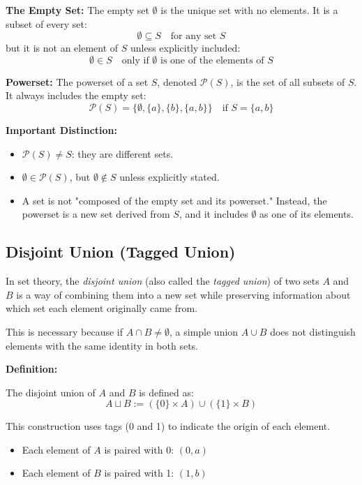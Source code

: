 \documentclass[10pt]{article}
\theoremstyle{plain}
\theoremstyle{definition}
\begin{document}
	\textbf{The Empty Set:} The empty set \( \emptyset \) is the unique set with no elements. It is a subset of every set:
	\[
	\emptyset \subseteq S \quad \text{for any set } S
	\]
	but it is not an element of \( S \) unless explicitly included:
	\[
	\emptyset \in S \quad \text{only if } \emptyset \text{ is one of the elements of } S
	\]
	
	\textbf{Powerset:} The powerset of a set \( S \), denoted \( \mathcal{P}(S) \), is the set of all subsets of \( S \). It always includes the empty set:
	\[
	\mathcal{P}(S) = \{ \emptyset, \{a\}, \{b\}, \{a, b\} \} \quad \text{if } S = \{a, b\}
	\]
	
	\textbf{Important Distinction:}
	\begin{itemize}
		\item \( \mathcal{P}(S) \neq S \): they are different sets.
		\item \( \emptyset \in \mathcal{P}(S) \), but \( \emptyset \notin S \) unless explicitly stated.
		\item A set is not "composed of the empty set and its powerset." Instead, the powerset is a new set derived from \( S \), and it includes \( \emptyset \) as one of its elements.
	\end{itemize}
	
	
	\subsection*{Disjoint Union (Tagged Union)}
	
	In set theory, the \emph{disjoint union} (also called the \emph{tagged union}) of two sets \( A \) and \( B \) is a way of combining them into a new set while preserving information about which set each element originally came from.
	
	This is necessary because if \( A \cap B \neq \emptyset \), a simple union \( A \cup B \) does not distinguish elements with the same identity in both sets.
	
	\textbf{Definition:}
	
	The disjoint union of \( A \) and \( B \) is defined as:
	\[
	A \sqcup B := (\{0\} \times A) \cup (\{1\} \times B)
	\]
	
	This construction uses tags (0 and 1) to indicate the origin of each element.
	
	\begin{itemize}
		\item Each element of \( A \) is paired with 0: \( (0, a) \)
		\item Each element of \( B \) is paired with 1: \( (1, b) \)
	\end{itemize}
	
\end{document}
